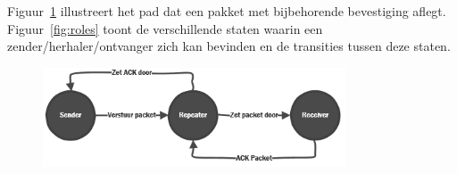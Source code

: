 \documentclass[a4paper,10pt]{article}
\begin{document}
Figuur~\ref{fig:flow} illustreert het pad dat een pakket met bijbehorende bevestiging aflegt. Figuur~\ref{fig:roles} toont de verschillende staten waarin een zender/herhaler/ontvanger zich kan bevinden en de transities tussen deze staten.

\begin{figure}[ht!]
    \centering
    \includegraphics[width=0.8\textwidth]{flow.png}
    \caption{}
    \label{fig:flow}
\end{figure}
\end{document}
